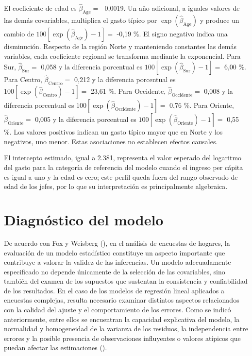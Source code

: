 \documentclass[
  spanish,
  11pt,
  letterpaper,
  oneside,
  open=any]{scrbook}
\begin{document}
El coeficiente de edad es \(\hat\beta_{\mathrm{Age}}=\) -0,0019. Un año
adicional, a iguales valores de las demás covariables, multiplica el
gasto típico por \(\exp(\hat\beta_{\mathrm{Age}})\) y produce un cambio
de \(100[\exp(\hat\beta_{\mathrm{Age}})-1]=\) -0,19 \%. El signo
negativo indica una disminución. Respecto de la región Norte y
manteniendo constantes las demás variables, cada coeficiente regional se
transforma mediante la exponencial. Para Sur,
\(\hat\beta_{\mathrm{Sur}}=\) 0,058 y la diferencia porcentual es
\(100[\exp(\hat\beta_{\mathrm{Sur}})-1]=\) 6,00 \%. Para Centro,
\(\hat\beta_{\mathrm{Centro}}=\) 0,212 y la diferencia porcentual es
\(100[\exp(\hat\beta_{\mathrm{Centro}})-1]=\) 23,61 \%. Para Occidente,
\(\hat\beta_{\mathrm{Occidente}}=\) 0,008 y la diferencia porcentual es
\(100[\exp(\hat\beta_{\mathrm{Occidente}})-1]=\) 0,76 \%. Para Oriente,
\(\hat\beta_{\mathrm{Oriente}}=\) 0,005 y la diferencia porcentual es
\(100[\exp(\hat\beta_{\mathrm{Oriente}})-1]=\) 0,55 \%. Los valores
positivos indican un gasto típico mayor que en Norte y los negativos,
uno menor. Estas asociaciones no establecen efectos causales.

El intercepto estimado, igual a 2.381, representa el valor esperado del
logaritmo del gasto para la categoría de referencia del modelo cuando el
ingreso per cápita es igual a uno y la edad es cero; este perfil queda
fuera del rango observado de edad de los jefes, por lo que su
interpretación es principalmente algebraica.

\section{Diagnóstico del modelo}\label{diagnostico-del-modelo}

De acuerdo con Fox y Weisberg (), en
el análisis de encuestas de hogares, la evaluación de un modelo
estadístico constituye un aspecto importante que contribuye a valorar la
validez de las inferencias. Un modelo adecuadamente especificado no
depende únicamente de la selección de las covariables, sino también del
examen de los supuestos que sustentan la consistencia y confiabilidad de
los resultados. En el caso de los modelos de regresión lineal aplicados
a encuestas complejas, resulta necesario examinar distintos aspectos
relacionados con la calidad del ajuste y el comportamiento de los
errores. Como se indicó anteriormente, entre ellos se encuentran la
capacidad explicativa del modelo, la normalidad y homogeneidad de la
varianza de los residuos, la independencia entre errores y la posible
presencia de observaciones influyentes o valores atípicos que puedan
afectar las estimaciones ().
\end{document}
